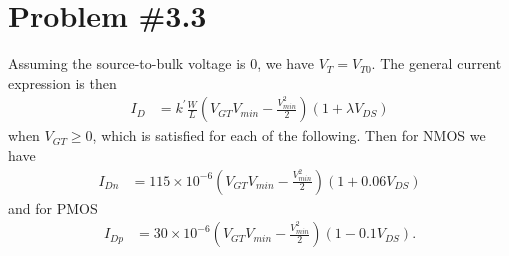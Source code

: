\documentclass{article}
\begin{document}
\section*{Problem \#3.3}
Assuming the source-to-bulk voltage is 0, we have $V_T = V_{T0}$.
The general current expression is then
\begin{align*}
I_D &= k^\prime \frac{W}{L}
       \left(V_{GT}V_{min} - \frac{V_{min}^2}{2}\right)
       (1 + \lambda V_{DS})
\end{align*}
when $V_{GT} \geq 0$, which is satisfied for each of the following.
Then for NMOS we have
\begin{align*}
I_{Dn} &= 115 \times 10^{-6}
         \left(V_{GT}V_{min} - \frac{V_{min}^2}{2}\right)
         (1 + 0.06 V_{DS})
\end{align*}
and for PMOS
\begin{align*}
I_{Dp} &= 30 \times 10^{-6}
         \left(V_{GT}V_{min} - \frac{V_{min}^2}{2}\right)
         (1 - 0.1 V_{DS}).
\end{align*}
\end{document}
